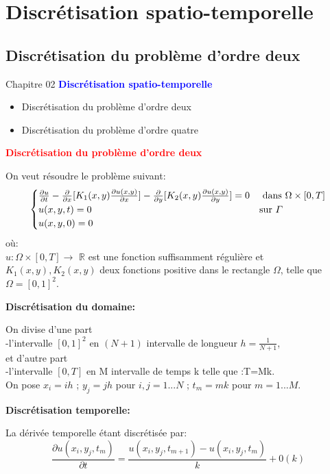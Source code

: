 \documentclass[12pt]{beamer}
\begin{document}
\section{Discr\'{e}tisation spatio-temporelle}
\subsection*{Discr\'{e}tisation du probl\`{e}me d'ordre deux}
\begin{frame}{Chapitre 02}
\textbf{\textcolor{blue}{\large {Discr\'{e}tisation spatio-temporelle}}}
\begin{itemize}
	\item Discr\'{e}tisation du probl\`{e}me d'ordre deux
	\item Discr\'{e}tisation du probl\`{e}me d'ordre quatre
\end{itemize}
\end{frame}
\begin{frame}
\textcolor{red}{\textbf{Discr\'{e}tisation du probl\`{e}me d'ordre deux}}
\begin{block}{}
On veut r\'esoudre le   probl\`eme suivant:
 \begin{equation}
\begin{cases}
\frac{\partial{u}}{\partial{t}}-\frac{\partial}{\partial{x}}[ K_{1}(x, y)\frac{\partial{u}(x,y)}{\partial{x}}]-\frac{\partial}{\partial{y}}[K_{2}(x, y)\frac{\partial{u}(x, y)}{\partial{y}}]=0 & \text{ dans $ \Omega\times[0,T]$}\\
u(x,y,t)=0 & \text{sur $\varGamma $ }\\
u(x,y,0)=0   
\end{cases}
\label{a}\end{equation}
o\`{u}:\\
$u:\Omega\times[0,T]\longrightarrow$ ${\mathbb{R}}$ est une fonction suffisamment r\'{e}guli\`{e}re et $ K_{1}(x,y),K_{2}(x,y)$ deux fonctions positive dans le rectangle $\Omega$, telle que $\Omega=[0,1]^{2}$.


\end{block}


 \end{frame}
 \begin{frame}
 	\textbf{Discr\'{e}tisation du domaine:}
 \begin{block}{}
 	 On divise d'une part\\
 	-l'intervalle $[0,1]^{2}$ en $ (N+1) $ intervalle de longueur $h=\frac{1}{N+1}$,\\ et d'autre part\\
 	-l'intervalle $[0,T] $ en M intervalle de temps k telle que :T=Mk.\\
 	On pose $x_{i}=ih$ ; $y_{j}=jh$ pour $ i,j=1...N$ ; $t_{m}=mk $ pour $m=1...M.	$
 \end{block}
\textbf{Discr\'{e}tisation temporelle: }
 	 \begin{block}{}
 		La d\'{e}riv\'{e}e temporelle \'{e}tant discr\'{e}tis\'{e}e par:
 		\begin{equation}
 		\frac{\partial{u}(x_{i},y_{j},t_{m})}{\partial{t}}=\frac{{u}(x_{i},y_{j},t_{m+1})-u(x_{i},y_{j},t_{m})}{k}+0(k)\end{equation}
 	\end{block}
 \end{frame}
\end{document}
